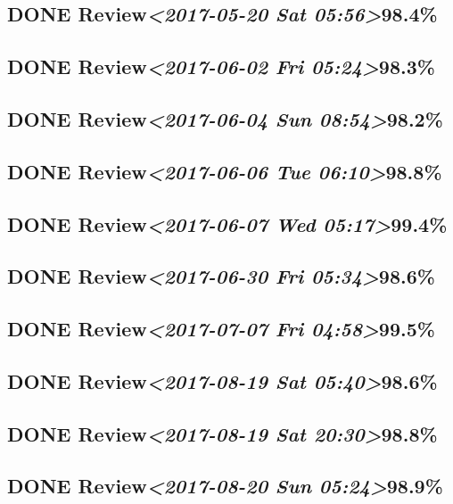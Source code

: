 \documentclass[11pt]{ctexart}
\begin{document}
\subsection{{\bfseries\sffamily DONE} Review\textit{<2017-05-20 Sat 05:56>}98.4\%}
\label{sec:org4bc6a71}
\subsection{{\bfseries\sffamily DONE} Review\textit{<2017-06-02 Fri 05:24>}98.3\%}
\label{sec:org64f06f9}
\subsection{{\bfseries\sffamily DONE} Review\textit{<2017-06-04 Sun 08:54>}98.2\%}
\label{sec:org0dea755}
\subsection{{\bfseries\sffamily DONE} Review\textit{<2017-06-06 Tue 06:10>}98.8\%}
\label{sec:orgf4d43ab}
\subsection{{\bfseries\sffamily DONE} Review\textit{<2017-06-07 Wed 05:17>}99.4\%}
\label{sec:org10b878a}
\subsection{{\bfseries\sffamily DONE} Review\textit{<2017-06-30 Fri 05:34>}98.6\%}
\label{sec:orgbf22fd4}
\subsection{{\bfseries\sffamily DONE} Review\textit{<2017-07-07 Fri 04:58>}99.5\%}
\label{sec:orgce6d969}
\subsection{{\bfseries\sffamily DONE} Review\textit{<2017-08-19 Sat 05:40>}98.6\%}
\label{sec:org000a67e}
\subsection{{\bfseries\sffamily DONE} Review\textit{<2017-08-19 Sat 20:30>}98.8\%}
\label{sec:org1285cdc}
\subsection{{\bfseries\sffamily DONE} Review\textit{<2017-08-20 Sun 05:24>}98.9\%}
\label{sec:org57b29c1}
\end{document}
